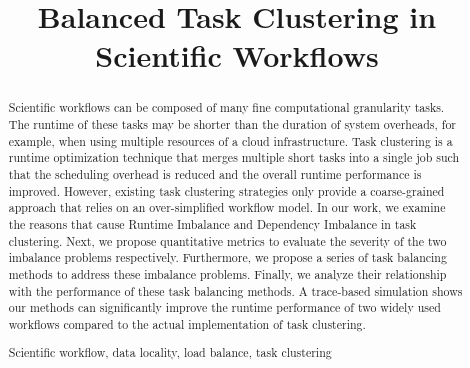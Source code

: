 \documentclass[final]{IEEEtran}
\begin{document}
\title{Balanced Task Clustering in Scientific Workflows}


\author{
}

\maketitle

\begin{abstract}
Scientific workflows can be composed of many fine computational granularity tasks. The runtime of these tasks may be shorter than the duration of system overheads, for example, when using multiple resources of a cloud infrastructure. Task clustering is a runtime optimization technique that merges multiple short tasks into a single job such that the scheduling overhead is reduced and the overall runtime performance is improved. However, existing task clustering strategies only provide a coarse-grained approach that relies on an over-simplified workflow model. In our work, we examine the reasons that cause Runtime Imbalance and Dependency Imbalance in task clustering. Next, we propose quantitative metrics to evaluate the severity of the two imbalance problems respectively. Furthermore, we propose a series of task balancing methods to address these imbalance problems. Finally, we analyze their relationship with the performance of these task balancing methods. A trace-based simulation shows our methods can significantly improve the runtime performance of two widely used workflows compared to the actual implementation of task clustering.

\begin{IEEEkeywords}
Scientific workflow, data locality, load balance, task clustering
\end{IEEEkeywords}
\end{abstract}
\end{document}
